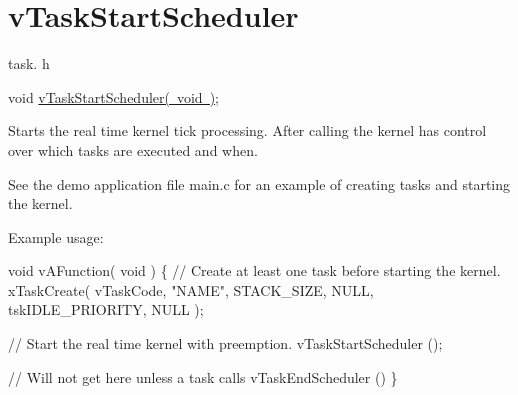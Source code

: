\hypertarget{group__v_task_start_scheduler}{}\section{v\+Task\+Start\+Scheduler}
\label{group__v_task_start_scheduler}
task. h 
\begin{DoxyPre}void \mbox{\hyperlink{task_8h_aaf9dca1065c60abdeb309d56ab7293cb}{vTaskStartScheduler( void )}};\end{DoxyPre}


Starts the real time kernel tick processing. After calling the kernel has control over which tasks are executed and when.

See the demo application file main.\+c for an example of creating tasks and starting the kernel.

Example usage\+: 
\begin{DoxyPre}
void vAFunction( void )
\{
    // Create at least one task before starting the kernel.
    xTaskCreate( vTaskCode, "NAME", STACK\_SIZE, NULL, tskIDLE\_PRIORITY, NULL );\end{DoxyPre}



\begin{DoxyPre}    // Start the real time kernel with preemption.
    vTaskStartScheduler ();\end{DoxyPre}



\begin{DoxyPre}    // Will not get here unless a task calls vTaskEndScheduler ()
\}
  \end{DoxyPre}
 